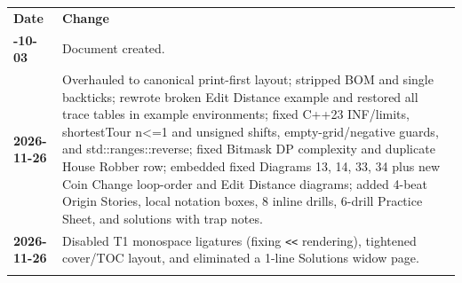 \documentclass[11pt,a4paper]{article}
\theoremstyle{definition}
\begin{document}
\begin{center}
\begingroup
\small
{}
\begin{tabularx}{\textwidth}{>{\bfseries}l >{\raggedright\arraybackslash}X}
\arrayrulecolor{primaryblue}\toprule[1.2pt]
\rowcolor{primaryblue!10}
\textcolor{primaryblue}{\textbf{Date}} & \textcolor{primaryblue}{\textbf{Change}} \\
\arrayrulecolor{codeframe}\midrule[0.6pt]
2026-10-03 & Document created. \\
2026-11-26 & Overhauled to canonical print-first layout; stripped BOM and single backticks; rewrote broken Edit Distance example and restored all trace tables in example environments; fixed C++23 INF/limits, shortestTour n<=1 and unsigned shifts, empty-grid/negative guards, and std::ranges::reverse; fixed Bitmask DP complexity and duplicate House Robber row; embedded fixed Diagrams 13, 14, 33, 34 plus new Coin Change loop-order and Edit Distance diagrams; added 4-beat Origin Stories, local notation boxes, 8 inline drills, 6-drill Practice Sheet, and solutions with trap notes. \\
2026-11-26 & Disabled T1 monospace ligatures (fixing \texttt{<<} rendering), tightened cover/TOC layout, and eliminated a 1-line Solutions widow page. \\
\arrayrulecolor{primaryblue}\bottomrule[1.2pt]
\end{tabularx}
\endgroup
\end{center}
\end{document}
